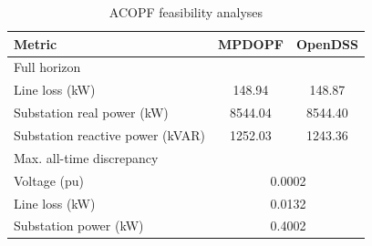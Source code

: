 \documentclass[../../outputs/main.tex]{subfiles}
\begin{document}

\begin{table}[h!]
    \centering
    \caption{ACOPF feasibility analyses}
    \begin{tabular}{|l|c|c|}
    \hline
    \textbf{Metric} & \textbf{MPDOPF} & \textbf{OpenDSS} \\ \hline
    Full horizon  & \multicolumn{2}{c|}{} \\ \hline
    \quad Line loss (kW) & 148.94 & 148.87 \\ \hline
    \quad Substation real power (kW) & 8544.04 & 8544.40 \\ \hline
    \quad Substation reactive power (kVAR) & 1252.03 & 1243.36 \\ \hline
    Max. all-time discrepancy & \multicolumn{2}{c|}{} \\ \hline
    \quad Voltage (pu) & \multicolumn{2}{c|}{0.0002} \\ \hline
    \quad Line loss (kW) & \multicolumn{2}{c|}{0.0132} \\ \hline
    \quad Substation power (kW) & \multicolumn{2}{c|}{0.4002} \\ \hline
    \end{tabular}
    \label{table:feas-copf-10-20-30}
\end{table}
\end{document}
